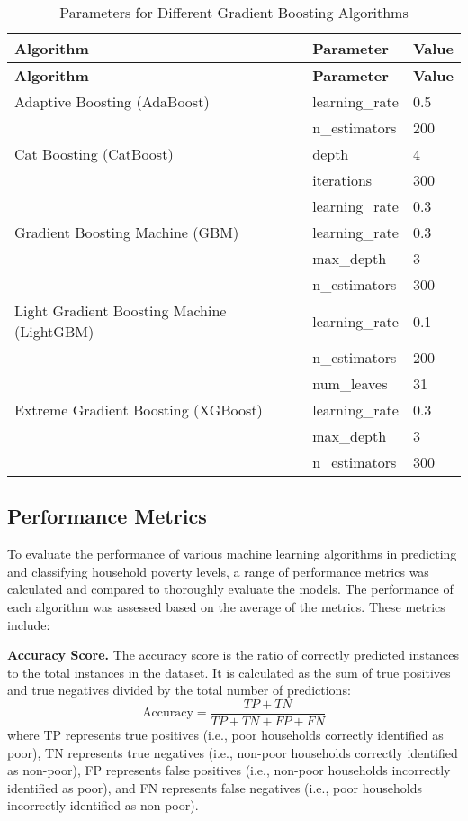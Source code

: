 \documentclass[a4paper,fleqn]{cas-sc}
\begin{document}
\begin{longtable}{lll}
    \caption{Parameters for Different Gradient Boosting Algorithms} \\
    \toprule
    \textbf{Algorithm} & \textbf{Parameter} & \textbf{Value} \\
    \midrule
    \endfirsthead
    \midrule
    \textbf{Algorithm} & \textbf{Parameter} & \textbf{Value} \\
    \midrule
    \endhead
    \bottomrule
    \endfoot
    \bottomrule
    \endlastfoot
    Adaptive Boosting (AdaBoost) & learning\_rate & 0.5 \\
     & n\_estimators & 200 \\
    \midrule
    Cat Boosting (CatBoost) & depth & 4 \\
     & iterations & 300 \\
     & learning\_rate & 0.3 \\
    \midrule
    Gradient Boosting Machine (GBM) & learning\_rate & 0.3 \\
     & max\_depth & 3 \\
     & n\_estimators & 300 \\
    \midrule
    Light Gradient Boosting Machine (LightGBM) & learning\_rate & 0.1 \\
     & n\_estimators & 200 \\
     & num\_leaves & 31 \\
    \midrule
    Extreme Gradient Boosting (XGBoost) & learning\_rate & 0.3 \\
     & max\_depth & 3 \\
     & n\_estimators & 300 \\
\end{longtable}

\subsection{Performance Metrics}
To evaluate the performance of various machine learning algorithms in predicting and classifying household poverty levels, a range of performance metrics was calculated and compared to thoroughly evaluate the models. The performance of each algorithm was assessed based on the average of the metrics. These metrics include:

\textbf{Accuracy Score.} The accuracy score is the ratio of correctly predicted instances to the total instances in the dataset. It is calculated as the sum of true positives and true negatives divided by the total number of predictions:
\begin{equation}
\text{Accuracy} = \frac{TP + TN}{TP + TN + FP + FN}
\end{equation}
where TP represents true positives (i.e., poor households correctly identified as poor), TN represents true negatives (i.e., non-poor households correctly identified as non-poor), FP represents false positives (i.e., non-poor households incorrectly identified as poor), and FN represents false negatives (i.e., poor households incorrectly identified as non-poor).
\end{document}
